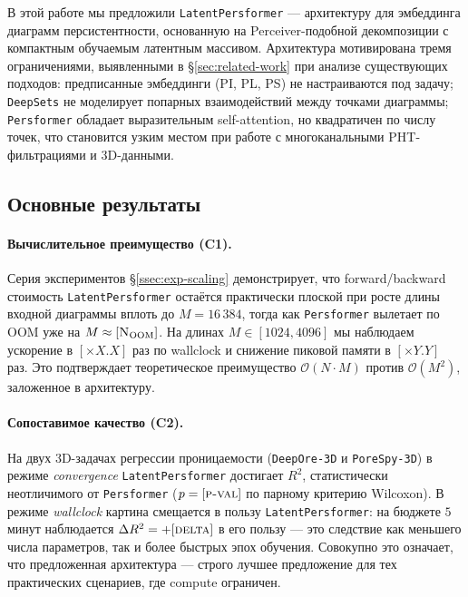 
В этой работе мы предложили \texttt{LatentPersformer} --- архитектуру для эмбеддинга диаграмм персистентности, основанную на Perceiver-подобной декомпозиции с компактным обучаемым латентным массивом. Архитектура мотивирована тремя ограничениями, выявленными в §\ref{sec:related-work} при анализе существующих подходов: предписанные эмбеддинги (PI, PL, PS) не настраиваются под задачу; \texttt{DeepSets} не моделирует попарных взаимодействий между точками диаграммы; \texttt{Persformer} обладает выразительным self-attention, но квадратичен по числу точек, что становится узким местом при работе с многоканальными PHT-фильтрациями и 3D-данными.

\subsection{Основные результаты}

\paragraph{Вычислительное преимущество (C1).} Серия экспериментов §\ref{ssec:exp-scaling} демонстрирует, что forward/backward стоимость \texttt{LatentPersformer} остаётся практически плоской при росте длины входной диаграммы вплоть до $M = 16\,384$, тогда как \texttt{Persformer} вылетает по OOM уже на $M \approx [\textsc{N}_\text{OOM}]$. На длинах $M \in [1024, 4096]$ мы наблюдаем ускорение в $[\times X.X]$ раз по wallclock и снижение пиковой памяти в $[\times Y.Y]$ раз. Это подтверждает теоретическое преимущество $\mathcal{O}(N \cdot M)$ против $\mathcal{O}(M^2)$, заложенное в архитектуру.

\paragraph{Сопоставимое качество (C2).} На двух 3D-задачах регрессии проницаемости (\texttt{DeepOre-3D} и \texttt{PoreSpy-3D}) в режиме \emph{convergence} \texttt{LatentPersformer} достигает $R^2$, статистически неотличимого от \texttt{Persformer} ($p = [\textsc{p-val}]$ по парному критерию Wilcoxon). В режиме \emph{wallclock} картина смещается в пользу \texttt{LatentPersformer}: на бюджете $5$ минут наблюдается $\Delta R^2 = +[\textsc{delta}]$ в его пользу --- это следствие как меньшего числа параметров, так и более быстрых эпох обучения. Совокупно это означает, что предложенная архитектура --- строго лучшее предложение для тех практических сценариев, где compute ограничен.

